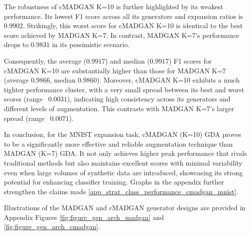 The robustness of cMADGAN K=10 is further highlighted by its weakest performance. Its lowest F1 score across all its generators and expansion ratios is $0.9902$. Strikingly, this worst score for cMADGAN K=10 is identical to the best score achieved by MADGAN K=7. In contrast, MADGAN K=7's performance drops to $0.9831$ in its pessimistic scenario.

Consequently, the average ($0.9917$) and median ($0.9917$) F1 scores for cMADGAN K=10 are substantially higher than those for MADGAN K=7 (average $0.9866$, median $0.9860$). Moreover, cMADGAN K=10 exhibits a much tighter performance cluster, with a very small spread between its best and worst scores (range ~$0.0031$), indicating high consistency across its generators and different levels of augmentation. This contrasts with MADGAN K=7's larger spread (range ~$0.0071$).

In conclusion, for the MNIST expansion task, cMADGAN (K=10) GDA proves to be a significantly more effective and reliable augmentation technique than MADGAN (K=7) GDA. It not only achieves higher peak performance that rivals traditional methods but also maintains excellent scores with minimal variability even when large volumes of synthetic data are introduced, showcasing its strong potential for enhancing classifier training. Graphs in the appendix further strengthen the claims made \ref{app_strat_class_performance_cmadgan_mnist}.

Illustrations of the MADGAN and cMADGAN generator designs are provided in Appendix Figures \ref{fig:figure_gen_arch_madgan} and \ref{fig:figure_gen_arch_cmadgan}.


